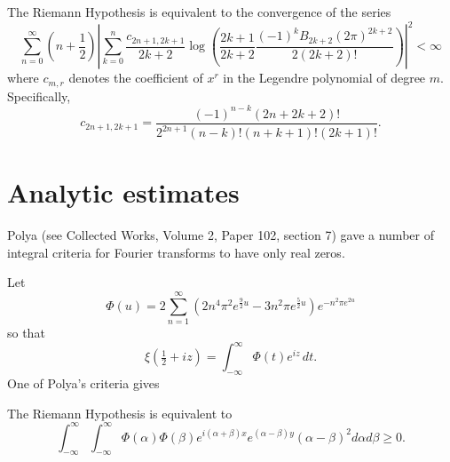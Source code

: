 \documentclass[12pt,letterpaper, reqno]{amsart}
\begin{document}
\begin{problemblock}

\begin{rhequivalence}[8.3]  
The Riemann Hypothesis is equivalent to the convergence of the series
$$
\sum_{n=0}^\infty\left(n+\frac{1}{2}\right)\left|\sum_{k=0}^n\frac{c_{2n+1,
2k+1}}{2k+2}\log\left(\frac{2k+1}{2k+2}\frac{\left(-1\right)^kB_{2k+2}\left(2
\pi\right)^{2k+2}}{2\left(2k+2\right)!}\right)\right|^2<\infty
$$
where $c_{m,r}$ denotes the coefficient of $x^r$ in the Legendre
polynomial of degree $m$.
Specifically,
$$
c_{2n+1,2k+1}=\frac{\left(-1\right)^{n-k}\left(2n+2k+2\right)!}
{2^{2n+1} \left(n-k\right)!\left(n+k+1\right)!\left(2k+1\right)!}.
$$
\end{rhequivalence}

\end{problemblock}

\section{Analytic estimates}

\begin{problemblock}
Polya (see Collected Works, Volume 2, Paper 102, section 7) gave a number of
integral criteria for Fourier transforms to have only real zeros.

Let
$$\Phi(u)=2\sum_{n=1}^\infty (2 n^4\pi^2e^{\frac 9 2 u}-3 n^2 \pi e^{\frac 5 2 u})e^{-n^2 \pi e^{2 u}}$$
so that
$$\xi(\tfrac12+i z)=\int_{-\infty}^\infty \Phi(t)e^{iz} \,dt.
$$
One of Polya's criteria gives

\begin{rhequivalence}[9.1] 
The Riemann Hypothesis is equivalent to
$$
\int_{-\infty}^\infty\int_{-\infty}^\infty
\Phi(\alpha)\Phi(\beta) e^{i(\alpha+\beta)x }
e^{(\alpha-\beta)y}(\alpha-\beta)^2 d\alpha  d\beta \ge 0.
$$
\end{rhequivalence}
\end{problemblock}
\end{document}
